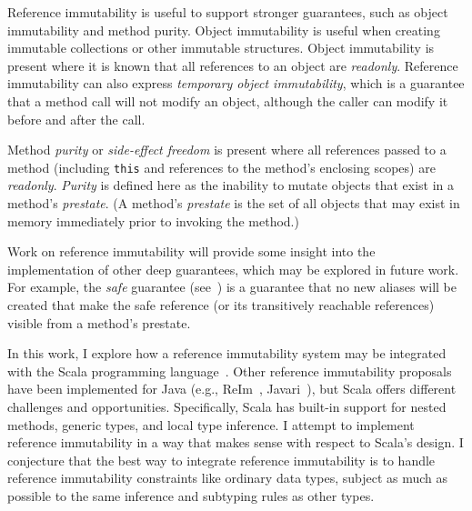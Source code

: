 \documentclass[letterpaper,11pt]{article}
\newcommand{\code}[1]{\lstinline$#1$}
\theoremstyle{definition}
\theoremstyle{remark}
\begin{document}
Reference immutability is useful to support stronger guarantees,
such as object immutability and method purity.
Object immutability is useful when creating immutable collections or other immutable
structures.
Object immutability is present where it is known that all references to an
object are \emph{readonly}.
Reference immutability can also express \emph{temporary object immutability},
which is a guarantee that a method call will not modify an object, although
the caller can modify it before and after the call.

Method \emph{purity} or \emph{side-effect freedom}
is present where all references passed to a method (including \code{this}
and references to the method's enclosing scopes) are \emph{readonly}.
\emph{Purity} is defined here as the inability to mutate
objects that exist in a method's \emph{prestate}.
(A method's \emph{prestate} is the set of all objects that may exist in memory
immediately prior to invoking the method.)

Work on reference immutability will provide some insight into the implementation
of other deep guarantees, which may be explored in future work.
For example, the \emph{safe} guarantee (see~\cite{purity-effect-java})
is a guarantee that no new aliases will be created that make the safe reference
(or its transitively reachable references) visible from a method's prestate.




\begin{comment}
Optimizations that depend on referential transparency may also benefit from
reference immutability.
If it can be established that a method is side-effect-free, does not throw exceptions,
and does not perform any synchronization operations
(such as \code{volatile} reads, interlocked operations, or calls to \code{synchronized} methods),
then the compiler should be able to treat that method as referentially transparent.
Extensions to the basic reference immutability system may be able
to represent \code{volatile} reads, synchronization operations, and I/O,
but I leave these extensions as challenges for future work.
\end{comment}

In this work, I explore how a reference immutability system may be integrated with
the Scala programming language~\cite{scala-book}.
Other reference immutability proposals have been implemented for Java (e.g., ReIm~\cite{reim},
Javari~\cite{javari}), but
Scala offers different challenges and opportunities.
Specifically, Scala has built-in support for nested methods,
generic types, and local type inference.
I attempt to implement reference immutability in a way that makes sense
with respect to Scala's design.
I conjecture that the best way to integrate reference immutability is to
handle reference immutability constraints like ordinary data types,
subject as much as possible to the same inference and subtyping rules as other types.
\end{document}
